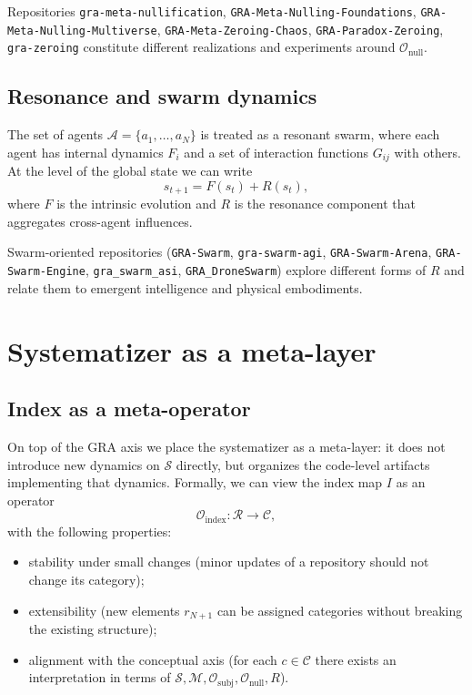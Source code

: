 \documentclass[11pt,a4paper]{article}
\begin{document}
Repositories \texttt{gra-meta-nullification},
\texttt{GRA-Meta-Nulling-Foundations},
\texttt{GRA-Meta-Nulling-Multiverse},
\texttt{GRA-Meta-Zeroing-Chaos},
\texttt{GRA-Paradox-Zeroing},
\texttt{gra-zeroing}
constitute different realizations and experiments around
$\mathcal{O}_{\text{null}}$.

\subsection{Resonance and swarm dynamics}

The set of agents $\mathcal{A} = \{a_1,\dots,a_N\}$ is treated as a
resonant swarm, where each agent has internal dynamics $F_i$ and a set
of interaction functions $G_{ij}$ with others.
At the level of the global state we can write
\[
  s_{t+1} = F(s_t) + R(s_t),
\]
where $F$ is the intrinsic evolution and $R$ is the resonance component
that aggregates cross-agent influences.

Swarm-oriented repositories (\texttt{GRA-Swarm},
\texttt{gra-swarm-agi}, \texttt{GRA-Swarm-Arena},
\texttt{GRA-Swarm-Engine}, \texttt{gra\_swarm\_asi},
\texttt{GRA\_DroneSwarm}) explore different forms of $R$ and relate them
to emergent intelligence and physical embodiments.

\section{Systematizer as a meta-layer}

\subsection{Index as a meta-operator}

On top of the GRA axis we place the systematizer as a meta-layer:
it does not introduce new dynamics on $\mathcal{S}$ directly, but
organizes the code-level artifacts implementing that dynamics.
Formally, we can view the index map $I$ as an operator
\[
  \mathcal{O}_{\text{index}} : \mathcal{R} \rightarrow \mathcal{C},
\]
with the following properties:
\begin{itemize}
  \item stability under small changes (minor updates of a repository
        should not change its category);
  \item extensibility (new elements $r_{N+1}$ can be assigned categories
        without breaking the existing structure);
  \item alignment with the conceptual axis (for each $c \in \mathcal{C}$
        there exists an interpretation in terms of
        $\mathcal{S}, \mathcal{M}, \mathcal{O}_{\text{subj}},
         \mathcal{O}_{\text{null}}, R$).
\end{itemize}
\end{document}
